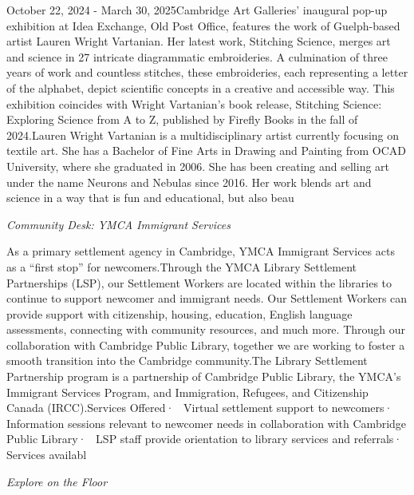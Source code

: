 \documentclass[letterpaper, 10pt]{article}
\newcommand{\subtitle}[1]{\textit{\large #1}\vspace{0.5em}}
\newcommand{\articlecontent}[1]{\small #1\vspace{1em}}
\begin{document}
\begin{multicols}{2}
{October 22, 2024 - March 30, 2025Cambridge Art Galleries' inaugural pop-up exhibition at Idea Exchange, Old Post Office, features the work of Guelph-based artist Lauren Wright Vartanian. Her latest work, Stitching Science, merges art and science in 27 intricate diagrammatic embroideries. A culmination of three years of work and countless stitches, these embroideries, each representing a letter of the alphabet, depict scientific concepts in a creative and accessible way. This exhibition coincides with Wright Vartanian’s book release, Stitching Science: Exploring Science from A to Z, published by Firefly Books in the fall of 2024.Lauren Wright Vartanian is a multidisciplinary artist currently focusing on textile art. She has a Bachelor of Fine Arts in Drawing and Painting from OCAD University, where she graduated in 2006. She has been creating and selling art under the name Neurons and Nebulas since 2016. Her work blends art and science in a way that is fun and educational, but also beau
}
\vspace{10px}

\subtitle{Community Desk: YMCA Immigrant Services}

\articlecontent{

\qrcode[height=1.5cm]{https://ideaexchange.libnet.info/event/12494609}
\vspace{10px}

As a primary settlement agency in Cambridge, YMCA Immigrant Services acts as a “first stop” for newcomers.Through the YMCA Library Settlement Partnerships (LSP), our Settlement Workers are located within the libraries to continue to support newcomer and immigrant needs. Our Settlement Workers can provide support with citizenship, housing, education, English language assessments, connecting with community resources, and much more. Through our collaboration with Cambridge Public Library, together we are working to foster a smooth transition into the Cambridge community.The Library Settlement Partnership program is a partnership of Cambridge Public Library, the YMCA’s Immigrant Services Program, and Immigration, Refugees, and Citizenship Canada (IRCC).Services Offered·  Virtual settlement support to newcomers·  Information sessions relevant to newcomer needs in collaboration with Cambridge Public Library·  LSP staff provide orientation to library services and referrals·  Services availabl
}
\vspace{10px}

\subtitle{Explore on the Floor}

\articlecontent{

}
\end{multicols}
\end{document}
